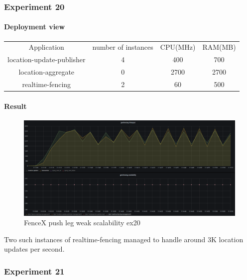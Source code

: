 \documentclass[a4]{report}
\begin{document}
        \subsubsection{Experiment 20}

        \paragraph{Deployment view}
        \begin{center}
            \begin{tabular}{ c c c c }
                Application               & number of instances & CPU(MHz) & RAM(MB) \\
                location-update-publisher & 4                   & 400      & 700     \\
                location-aggregate        & 0                   & 2700     & 2700    \\
                realtime-fencing          & 2                   & 60       & 500     \\
            \end{tabular}
        \end{center}

        \paragraph{Result}
        \begin{figure}[ht]
            \caption{FenceX push leg weak scalability ex20}
            \label{fig:ex20}
            \includegraphics[scale=0.4]{images/evaluation/ex20-benchmarking-ongoing-1per10sec.png}
        \end{figure}

        Two such instances of realtime-fencing managed to handle around 3K location updates per second.

        \subsubsection{Experiment 21}
\end{document}
